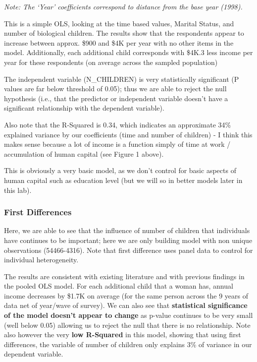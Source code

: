 \documentclass[
]{article}
\begin{document}
\emph{Note: The `Year' coefficients correspond to distance from the base
year (1998).}

This is a simple OLS, looking at the time based values, Marital Status,
and number of biological children. The results show that the respondents
appear to increase between approx. \$900 and \$4K per year with no other
items in the model. Additionally, each additional child corresponds with
\$4K.3 less income per year for these respondents (on average across the
sampled population)

The independent variable (N\_CHILDREN) is very statistically significant
(P values are far below threshold of 0.05); thus we are able to reject
the null hypothesis (i.e., that the predictor or independent variable
doesn't have a significant relationship with the dependent variable).

Also note that the R-Squared is 0.34, which indicates an approximate
34\% explained variance by our coefficients (time and number of
children) - I think this makes sense because a lot of income is a
function simply of time at work / accumulation of human capital (see
Figure 1 above).

This is obviously a very basic model, as we don't control for basic
aspects of human capital such as education level (but we will so in
better models later in this lab).

\hypertarget{first-differences}{%
\subsubsection{First Differences}\label{first-differences}}

Here, we are able to see that the influence of number of children that
individuals have continues to be important; here we are only building
model with non unique observations (54466-4316). Note that first
difference uses panel data to control for individual heterogeneity.

The results are consistent with existing literature and with previous
findings in the pooled OLS model. For each additional child that a woman
has, annual income decreases by \$1.7K on average (for the same person
across the 9 years of data net of year/wave of survey). We can also see
that \textbf{statistical significance of the model doesn't appear to
change} as p-value continues to be very small (well below 0.05) allowing
us to reject the null that there is no relationship. Note also however
the very \textbf{low R-Squared} in this model, showing that using first
differences, the variable of number of children only explains 3\% of
variance in our dependent variable.
\end{document}
